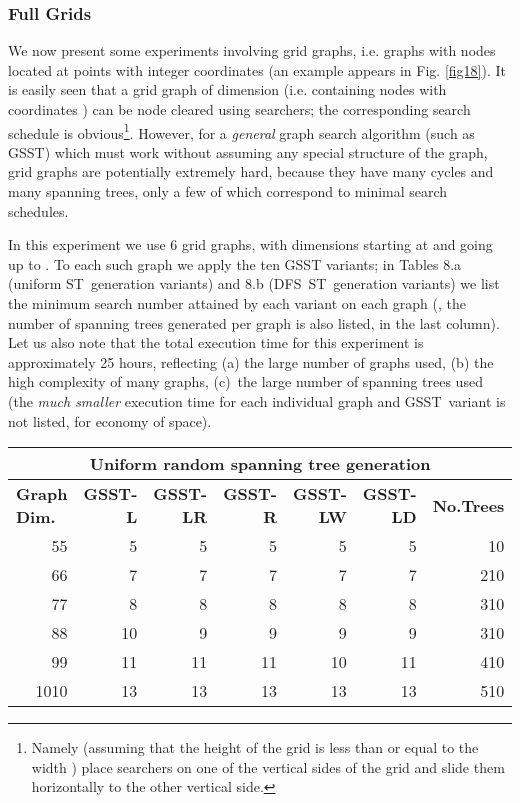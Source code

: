 \documentclass[11pt]{article}\usepackage{amsmath}
\begin{document}
\label{sec0603}

\subsubsection{Full Grids}

We now present some experiments involving grid graphs, i.e. graphs with nodes
located at points with integer coordinates (an example appears in Fig.
\ref{fig18}). It is easily seen that a grid graph of dimension  (i.e. containing nodes with coordinates )
can be node cleared using  searchers;
the corresponding search schedule is obvious\footnote{Namely (assuming that
the height  of the grid is less than or equal to the width )
place  searchers on one of the vertical sides of the grid and slide
them horizontally to the other vertical side.}. However, for a \emph{general}
graph search algorithm (such as GSST) which must work without assuming any
special structure of the graph, grid graphs are potentially extremely hard,
because they have many cycles and many spanning trees, only a few of which
correspond to minimal search schedules.

In this experiment we use 6 grid graphs, with dimensions starting at
 and going up to . To each such graph we apply the ten
GSST variants; in Tables 8.a (uniform ST\ generation variants) and 8.b
(DFS\ ST\ generation variants) we list the minimum search number attained by
each variant on each graph (, the number of spanning trees generated per
graph is also listed, in the last column). Let us also note that the total
execution time for this experiment is approximately 25 hours, reflecting (a)
the large number of graphs used, (b) the high complexity of many graphs,
(c)\ the large number of spanning trees used (the \emph{much smaller
}execution time for each individual graph and GSST\ variant is not listed, for
economy of space).

\begin{center}\begin{tabular}
[c]{|l|r|r|r|r|r|r|}\hline
\multicolumn{7}{|c|}{\textbf{Uniform random spanning tree generation}}\\\hline
\textbf{Graph Dim.} & \textbf{GSST-L} & \textbf{GSST-LR} & \textbf{GSST-R} &
\textbf{GSST-LW} & \textbf{GSST-LD} & \textbf{No.Trees}\\\hline
\multicolumn{1}{|r|}{55} & 5 & 5 & 5 & 5 & 5 & 10\\\hline
\multicolumn{1}{|r|}{66} & 7 & 7 & 7 & 7 & 7 & 210\\\hline
\multicolumn{1}{|r|}{77} & 8 & 8 & 8 & 8 & 8 & 310\\\hline
\multicolumn{1}{|r|}{88} & 10 & 9 & 9 & 9 & 9 & 310\\\hline
\multicolumn{1}{|r|}{99} & 11 & 11 & 11 & 10 & 11 & 410\\\hline
\multicolumn{1}{|r|}{1010} & 13 & 13 & 13 & 13 & 13 & 510\\\hline
\end{tabular}



\end{center}
\end{document}
